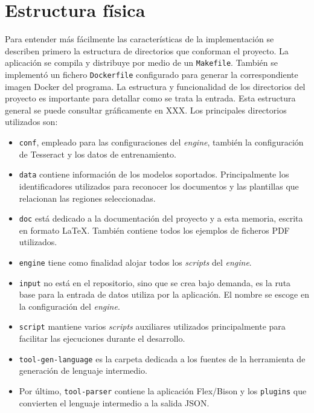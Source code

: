 
\section{Estructura física}

Para entender más fácilmente las características de la implementación se describen primero la estructura de directorios que conforman el proyecto. La aplicación se compila y distribuye por medio de un \verb|Makefile|. También se implementó un fichero \verb|Dockerfile|  configurado para generar la correspondiente imagen Docker del programa. 
La estructura y funcionalidad de los directorios del proyecto es importante para detallar como se trata la entrada. Esta estructura general se puede consultar gráficamente en XXX. Los principales directorios utilizados son:

\begin{itemize}
    \item \verb|conf|, empleado para las configuraciones del \emph{engine}, también la configuración de Tesseract y los datos de entrenamiento.
    \item \verb|data| contiene información de los modelos soportados. Principalmente los identificadores utilizados para reconocer los documentos y las plantillas que relacionan las regiones seleccionadas.
    \item \verb|doc| está dedicado a la documentación del proyecto y a esta memoria, escrita en formato \LaTeX. También contiene todos los ejemplos de ficheros PDF utilizados.
    \item \verb|engine| tiene como finalidad alojar todos los \emph{scripts} del \emph{engine}.
    \item \verb|input| no está en el repositorio, sino que se crea bajo demanda, es la ruta base para la entrada de datos utiliza por la aplicación. El nombre se escoge en la configuración del \emph{engine}.
    \item \verb|script| mantiene varios \emph{scripts} auxiliares utilizados principalmente para facilitar las ejecuciones durante el desarrollo.
    \item \verb|tool-gen-language| es la carpeta dedicada a los fuentes de la herramienta de generación de lenguaje intermedio.
    \item Por último, \verb|tool-parser| contiene la aplicación Flex/Bison y los \verb|plugins| que convierten el lenguaje intermedio a la salida JSON.
\end{itemize}


